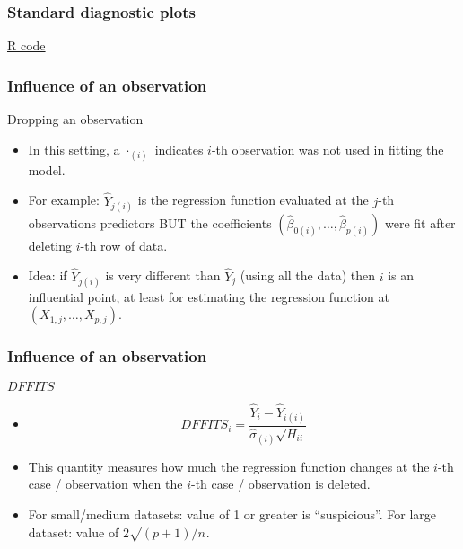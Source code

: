\documentclass[handout]{beamer}
\begin{document}


   \begin{frame}
   \frametitle{Standard diagnostic plots}
   \begin{center}
   \end{center}
   \href{http://stats191.stanford.edu/diagnostics.html#standard-diagnostic-plots}{R code}
   \end{frame}


   \begin{frame} \frametitle{Influence of an observation}

   \begin{block}
   {Dropping an observation}
   \begin{itemize}[<+->]

   \item In this setting, a $\cdot_{(i)}$ indicates $i$-th observation was not used in fitting the model.

   \item For example: $\widehat{Y}_{j(i)}$ is the regression
   function evaluated at the $j$-th observations  predictors BUT
   the coefficients $(\widehat{\beta}_{0(i)}, \dots, \widehat{\beta}_{p(i)})$
   were fit after deleting $i$-th row of data.

   \item Idea: if $\widehat{Y}_{j(i)}$ is very different than $\widehat{Y}_j$ (using all the data) then $i$ is an influential point, at least for estimating the regression function at $(X_{1,j}, \dots, X_{p,j})$.
   \end{itemize}

   \end{block}
   \end{frame}


   \begin{frame} \frametitle{Influence of an observation}

   \begin{block}
   {$DFFITS$}
   \begin{itemize}[<+->]

   \item $$
   DFFITS_i = \frac{\widehat{Y}_i - \widehat{Y}_{i(i)}}{\widehat{\sigma}_{(i)} \sqrt{H_{ii}}}$$

   \item This quantity measures how much the regression function changes at the
   $i$-th case / observation when the $i$-th case / observation is deleted.

   \item For small/medium datasets: value of 1 or greater is ``suspicious''. For large dataset: value of $2 \sqrt{(p+1)/n}$.
   \end{itemize}

   \end{block}
   \end{frame}
\end{document}
